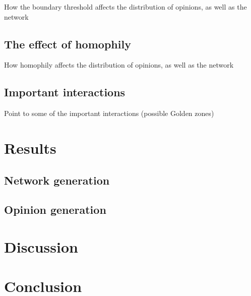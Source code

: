\documentclass{article}
\begin{document}
How the boundary threshold affects the distribution of opinions, as well as the network

\subsection{The effect of homophily}

How homophily affects the distribution of opinions, as well as the network

\subsection{Important interactions}

Point to some of the important interactions (possible Golden zones)

\section{Results}

\subsection{Network generation}

\subsection{Opinion generation}

\section{Discussion}

\section{Conclusion}




\end{document}
